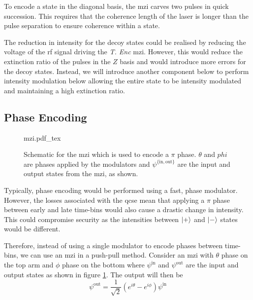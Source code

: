
To encode a state in the diagonal basis, the \ac{mzi} carves two pulses in quick succession. This requires that the coherence length of the laser is longer than the pulse separation to ensure coherence within a state. 

\begin{parahigh}
The reduction in intensity for the decoy states could be realised by reducing the voltage of the \acs{rf} signal driving the \textit{T. Enc} \ac{mzi}. However, this would reduce the extinction ratio of the pulses in the $Z$ basis and would introduce more errors for the decoy states. Instead, we will introduce another component below to perform intensity modulation below allowing the entire state to be intensity modulated and maintaining a high extinction ratio.
\end{parahigh}

\subsection{Phase Encoding}
\label{sec:phase_encoding}
\begin{figure}[t]
	\centering
	\small
	\def\svgwidth{0.6\textwidth} 
	{mzi.pdf_tex}
	\caption[MZI schematic for $\pi$ phase encoding]{Schematic for the \acs{mzi} which is used to encode a $\pi$ phase. $\theta$ and $phi$ are phases applied by the modulators and $\psi^{\{\mathrm{in},\mathrm{out}\}}$ are the input and output states from the \ac{mzi}, as shown.}
	\label{fig:mzi_pi_phase}
\end{figure}

Typically, phase encoding would be performed using a fast, phase modulator. However, the losses associated with the \ac{qcse} mean that applying a $\pi$ phase between early and late time-bins would also cause a drastic change in intensity. This could compromise security as the intensities between $\ket{+}$ and $\ket{-}$ states would be different.

\begin{parahigh}
Therefore, instead of using a single modulator to encode phases between time-bins, we can use an \ac{mzi} in a push-pull method. Consider an \ac{mzi} with $\theta$ phase on the top arm and $\phi$ phase on the bottom where $\psi^\mathrm{in}$ and $\psi^\mathrm{out}$ are the input and output states as shown in figure \ref{fig:mzi_pi_phase}. The output will then be 
\begin{equation}
	\psi^\mathrm{out} =  \frac{1}{\sqrt{2}}\left(e^{i\theta} - e^{i\phi}\right) \psi^\mathrm{in}
\end{equation}
\end{parahigh}

